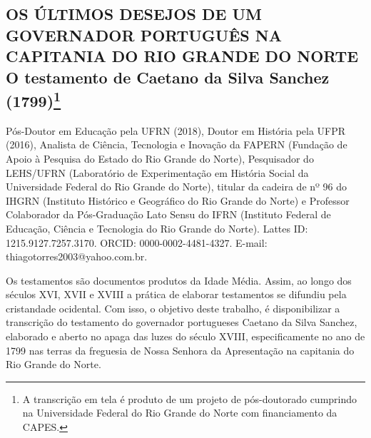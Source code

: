 \begin{refsection}
    \renewcommand{\thefigure}{\arabic{figure}}

    \chapter[Os últimos desejos de um governador português na capitania do Rio Grande do Norte: {\itshape o testamento de Caetano da Silva Sanchez (1799)}]{OS ÚLTIMOS DESEJOS DE UM GOVERNADOR PORTUGUÊS NA CAPITANIA DO RIO GRANDE DO NORTE\\O testamento de Caetano da Silva Sanchez (1799)\footnote{A transcrição em tela é produto de um projeto de pós-doutorado cumprindo na Universidade Federal do Rio Grande do Norte com financiamento da CAPES.}}
    \label{chap:transcricao}
    
    {Pós-Doutor em Educação pela UFRN (2018), Doutor em História pela UFPR
    (2016), Analista de Ciência, Tecnologia e Inovação da FAPERN (Fundação de
    Apoio à Pesquisa do Estado do Rio Grande do Norte), Pesquisador do
    LEHS/UFRN (Laboratório de Experimentação em História Social da Universidade
    Federal do Rio Grande do Norte), titular da cadeira de nº 96 do IHGRN
    (Instituto Histórico e Geográfico do Rio Grande do Norte) e Professor
    Colaborador da Pós-Graduação Lato Sensu do IFRN (Instituto Federal de
    Educação, Ciência e Tecnologia do Rio Grande do Norte).
    Lattes ID: 1215.9127.7257.3170. ORCID: 0000-0002-4481-4327. E-mail:
    thiagotorres2003@yahoo.com.br.}

    \vspace{5mm}

    Os testamentos  são documentos produtos da Idade Média. Assim, ao longo dos séculos XVI, XVII e XVIII a prática de elaborar testamentos se difundiu pela cristandade ocidental. Com isso, o objetivo deste trabalho, é disponibilizar a transcrição do testamento do governador portugueses Caetano da Silva Sanchez, elaborado e aberto no apaga das luzes do século XVIII, especificamente no ano de 1799 nas terras da freguesia de Nossa Senhora da Apresentação na capitania do Rio Grande do Norte. 


\end{refsection}
